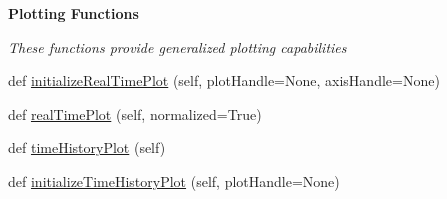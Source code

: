 \begin{Indent}{\bf Plotting Functions}\par
{\em These functions provide generalized plotting capabilities }\begin{DoxyCompactItemize}
\item 
def \hyperlink{classmodest_1_1substates_1_1substate_1_1SubState_a1adac64be88eab0a64bb952518c4268f}{initialize\+Real\+Time\+Plot} (self, plot\+Handle=None, axis\+Handle=None)
\item 
def \hyperlink{classmodest_1_1substates_1_1substate_1_1SubState_a2deb7d1ca3105eb20e50fa7e67298355}{real\+Time\+Plot} (self, normalized=True)
\item 
def \hyperlink{classmodest_1_1substates_1_1substate_1_1SubState_a643678c1193dd4029683a437e84229ac}{time\+History\+Plot} (self)
\item 
def \hyperlink{classmodest_1_1substates_1_1substate_1_1SubState_a1853d44036e3ed35ada02414ea29f8ab}{initialize\+Time\+History\+Plot} (self, plot\+Handle=None)
\end{DoxyCompactItemize}
\end{Indent}
